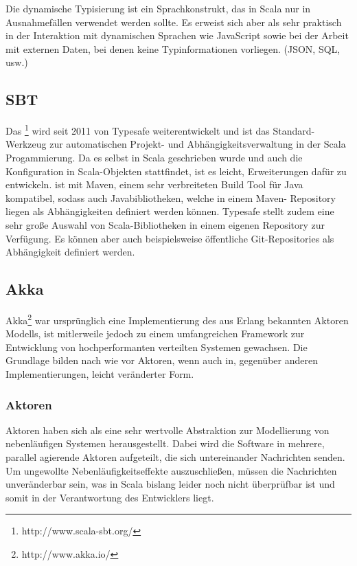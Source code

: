 Die dynamische Typisierung ist ein Sprachkonstrukt, das in Scala nur in Ausnahmefällen verwendet
werden sollte. Es erweist sich aber als sehr praktisch in der Interaktion mit dynamischen Sprachen
wie JavaScript sowie bei der Arbeit mit externen Daten, bei denen keine Typinformationen vorliegen.
(JSON, SQL, usw.)

\subsection{SBT}
\label{sec:sbt}

Das \footnote{http://www.scala-sbt.org/} wird seit 2011 von Typesafe weiterentwickelt und
ist das Standard-Werkzeug zur automatischen Projekt- und Abhängigkeitsverwaltung in der Scala
Progammierung. Da es selbst in Scala geschrieben wurde und auch die Konfiguration in Scala-Objekten
stattfindet, ist es leicht, Erweiterungen dafür zu entwickeln.  ist mit Maven, einem sehr
verbreiteten Build Tool für Java kompatibel, sodass auch Javabibliotheken, welche in einem Maven-
Repository liegen als Abhängigkeiten definiert werden können. Typesafe stellt zudem eine sehr große
Auswahl von Scala-Bibliotheken in einem eigenen Repository zur Verfügung. Es können aber auch
beispielsweise öffentliche Git-Repositories als Abhängigkeit definiert werden.

\subsection{Akka}
\label{sec:akka}

Akka\footnote{http://www.akka.io/} war ursprünglich eine Implementierung des aus Erlang bekannten
Aktoren Modells, ist mitlerweile jedoch zu einem umfangreichen Framework zur Entwicklung von
hochperformanten verteilten Systemen gewachsen. Die Grundlage bilden nach wie vor Aktoren, wenn auch
in, gegenüber anderen Implementierungen, leicht veränderter Form. \cite{actors}

\subsubsection{Aktoren}

Aktoren haben sich als eine sehr wertvolle Abstraktion zur Modellierung von nebenläufigen Systemen
herausgestellt. Dabei wird die Software in mehrere, parallel agierende Aktoren aufgeteilt, die
sich untereinander Nachrichten senden. Um ungewollte Nebenläufigkeitseffekte auszuschließen, müssen
die Nachrichten unveränderbar sein, was in Scala bislang leider noch nicht überprüfbar ist und somit
in der Verantwortung des Entwicklers liegt.

